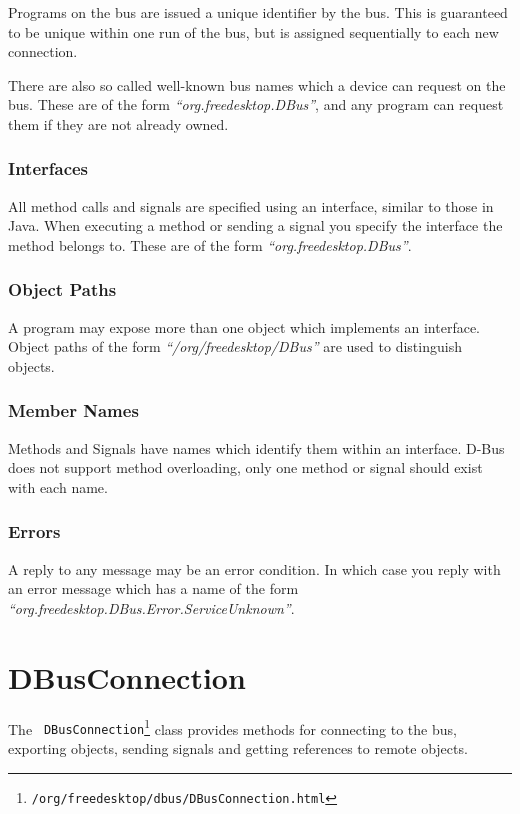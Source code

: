 \documentclass[a4paper,12pt]{article}
\begin{document}
Programs on the bus are issued a unique identifier by the bus. This
is guaranteed to be unique within one run of the bus, but is
assigned sequentially to each new connection. 

There are also so called well-known bus names which a device can
request on the bus. These are of the form {\em ``org.freedesktop.DBus''},
and any program can request them if they are not already owned.

\subsubsection{Interfaces}

All method calls and signals are specified using an interface,
similar to those in Java. When executing a method or sending a
signal you specify the interface the method belongs to. These are of
the form {\em ``org.freedesktop.DBus''}.

\subsubsection{Object Paths}

A program may expose more than one object which implements an
interface. Object paths of the form {\em ``/org/freedesktop/DBus''}
are used to distinguish objects.

\subsubsection{Member Names}

Methods and Signals have names which identify them within an
interface. D-Bus does not support method overloading, only one
method or signal should exist with each name.

\subsubsection{Errors}

A reply to any message may be an error condition. In which case you reply with
an error message which has a name of the form {\em
   ``org.freedesktop.DBus.Error.ServiceUnknown''}. 

\section{DBusConnection}

The {\tt
DBusConnection\footnote{\javadocroot/org/freedesktop/dbus/DBusConnection.html}}
class provides methods for connecting to the bus, exporting objects,
sending signals and getting references to remote objects.
\end{document}
